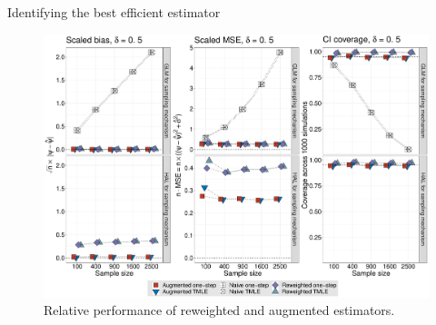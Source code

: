 \documentclass{beamer}
\begin{document}

\begin{frame}[c]{Identifying the best efficient estimator}

\begin{figure}[H]
  \centering
  \includegraphics[scale=0.22]{simple_effect_panel_delta_upshift}
  \caption{
    Relative performance of reweighted and augmented estimators.
  }
\end{figure}

\note{
}

\end{frame}

\end{document}
